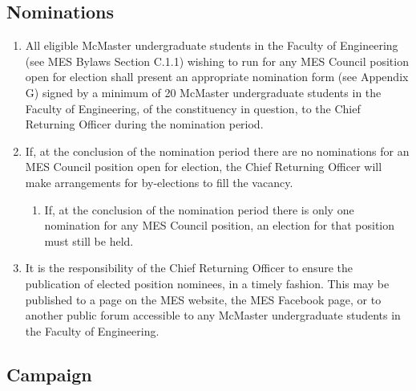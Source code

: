\subsection{Nominations}
\label{nominations}
\begin{enumerate}
 \item
  All eligible McMaster undergraduate students in the Faculty of
  Engineering (see MES Bylaws Section C.1.1) wishing to run for any MES
  Council position open for election shall present an appropriate
  nomination form (see Appendix G) signed by a minimum of 20 McMaster 
  undergraduate students in the Faculty of Engineering, of the constituency 
  in question, to the Chief Returning Officer during the nomination period. %
 \item
  If, at the conclusion of the nomination period there are no
  nominations for an MES Council position open for election, the Chief
  Returning Officer will make arrangements for by-elections to fill the
  vacancy.

  \begin{enumerate}
   \item
    If, at the conclusion of the nomination period there is only one
    nomination for any MES Council position, an election for that
    position must still be held.
  \end{enumerate}
 \item
  It is the responsibility of the Chief Returning Officer to ensure the
  publication of elected position nominees, in a timely fashion. This
  may be published to a page on the MES website, the MES Facebook page,
  or to another public forum accessible to any McMaster undergraduate
  students in the Faculty of Engineering.

\end{enumerate}


\subsection{Campaign}
\label{campaign}

